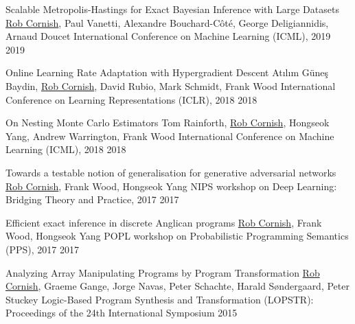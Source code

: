 \documentclass[9pt]{developercv} %
\begin{document}
\begin{entrylist}
    \publication
        {Scalable Metropolis-Hastings for Exact Bayesian Inference with Large Datasets}
        {\underline{Rob Cornish}, Paul Vanetti, Alexandre Bouchard-C\^ot\'e, George Deligiannidis, Arnaud Doucet}
        {International Conference on Machine Learning (ICML), 2019}
        {2019}

    \publication
        {Online Learning Rate Adaptation with Hypergradient Descent}
        {At\i l\i m G\"une\c s Baydin, \underline{Rob Cornish}, David Rubio, Mark Schmidt, Frank Wood}
        {International Conference on Learning Representations (ICLR), 2018}
        {2018}

    \publication
        {On Nesting Monte Carlo Estimators}
        {Tom Rainforth, \underline{Rob Cornish}, Hongseok Yang, Andrew Warrington, Frank Wood}
        {International Conference on Machine Learning (ICML), 2018}
        {2018}

    \publication
        {Towards a testable notion of generalisation for generative adversarial networks}
        {\underline{Rob Cornish}, Frank Wood, Hongseok Yang}
        {NIPS workshop on Deep Learning: Bridging Theory and Practice, 2017}
        {2017}

    \publication
        {Efficient exact inference in discrete Anglican programs}
        {\underline{Rob Cornish}, Frank Wood, Hongseok Yang}
        {POPL workshop on Probabilistic Programming Semantics (PPS), 2017}
        {2017}

    \publication
        {Analyzing Array Manipulating Programs by Program Transformation}
        {\underline{Rob Cornish}, Graeme Gange, Jorge Navas, Peter Schachte, Harald S\o ndergaard, Peter Stuckey}
        {Logic-Based Program Synthesis and Transformation (LOPSTR): Proceedings of the 24th International Symposium}
        {2015}
\end{entrylist}

\vspace{-1em}

\end{document}
